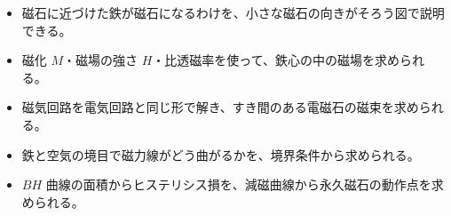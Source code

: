 \newcommand\sxharr[3]{\draw[bkRed!75!black, line width=0.9pt, -{Stealth[length=1.6mm]}] #1 ++({#2+180}:{#3/2}) -- ++(#2:#3);}
\newcommand\sxhout[2]{\begin{scope}[shift={#1}]\draw[bkInk, line width=0.6pt, fill=white] (0,0) circle (#2); \fill[bkInk] (0,0) circle ({0.32*#2});\end{scope}}
\newcommand\sxhin[2]{\begin{scope}[shift={#1}]\draw[bkInk, line width=0.6pt, fill=white] (0,0) circle (#2); \draw[bkInk, line width=0.6pt] (45:#2) -- (225:#2) (135:#2) -- (315:#2);\end{scope}}
\makeatother


\begin{goal}
\begin{itemize}[label={\color{bkTheme}●}, leftmargin=1.6\zw, itemsep=0pt, topsep=1pt]
\item {}\enspace 磁石に近づけた鉄が磁石になるわけを、小さな磁石の向きがそろう図で説明できる。
\item {}\enspace 磁化 $M$・磁場の強さ $H$・比透磁率を使って、鉄心の中の磁場を求められる。
\item {}\enspace 磁気回路を電気回路と同じ形で解き、すき間のある電磁石の磁束を求められる。
\item {}\enspace 鉄と空気の境目で磁力線がどう曲がるかを、境界条件から求められる。
\item {}\enspace $BH$ 曲線の面積からヒステリシス損を、減磁曲線から永久磁石の動作点を求められる。
\end{itemize}
\end{goal}


